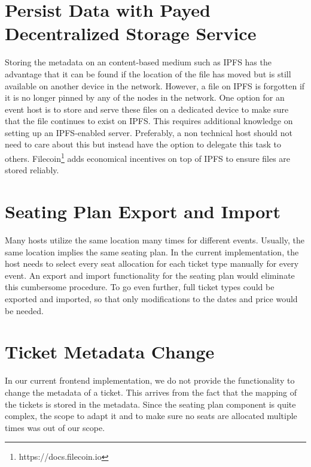 \section{Persist Data with Payed Decentralized Storage Service}
Storing the metadata on an content-based medium such as IPFS has the advantage that it can be found if the location of the file has moved but is still available on another device in the network. However, a file on IPFS is forgotten if it is no longer pinned by any of the nodes in the network. One option for an event host is to store and serve these files on a dedicated device to make sure that the file continues to exist on IPFS. This requires additional knowledge on setting up an IPFS-enabled server. Preferably, a non technical host should not need to care about this but instead have the option to delegate this task to others. Filecoin\footnote{https://docs.filecoin.io} adds economical incentives on top of IPFS to ensure files are stored reliably.

\section{Seating Plan Export and Import}
Many hosts utilize the same location many times for different events. Usually, the same location implies the same seating plan. In the current implementation, the host needs to select every seat allocation for each ticket type manually for every event. An export and import functionality for the seating plan would eliminate this cumbersome procedure. To go even further, full ticket types could be exported and imported, so that only modifications to the dates and price would be needed.

\section{Ticket Metadata Change}
\label{future-work-ticket-metadata-change}
In our current frontend implementation, we do not provide the functionality to change the metadata of a ticket. This arrives from the fact that the mapping of the tickets is stored in the metadata. Since the seating plan component is quite complex, the scope to adapt it and to make sure no seats are allocated multiple times was out of our scope.



